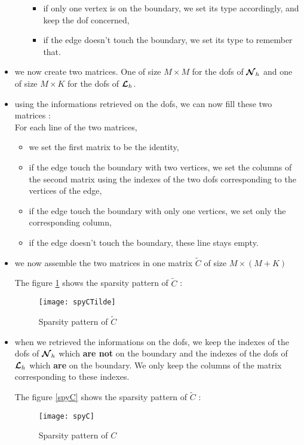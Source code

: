 \begin{itemize}
\begin{itemize}
\begin{itemize}
\item if only one vertex is on the boundary, we set its type accordingly, and
  keep the dof concerned,
\item if the edge doesn't touch the boundary, we set its type to remember that.
\end{itemize}
\end{itemize}
\item we now create two matrices. One of size $M\times M$ for the dofs of ${\bm{\mathcal{N}}}_h$ and one of size $M\times K$ for the dofs of ${\bm{\mathcal{L}}}_h$.

\item using the informations retrieved on the dofs, we can now fill these two
  matrices :\\
For each line of the two matrices,
\begin{itemize}
\item we set the first matrix to be the identity,
\item if the edge touch the boundary with two vertices, we set the columns of
  the second matrix using the indexes of the two dofs corresponding to the
  vertices of the edge,
\item if the edge touch the boundary with only one vertices, we set only the
  corresponding column,
\item if the edge doesn't touch the boundary, these line stays empty. 
\end{itemize}

\item we now assemble the two matrices in one matrix $\tilde{C}$ of size $M\times (M+K)$

The figure \ref{spyCTilde} shows the sparsity pattern of $\tilde{C}$ : 
\begin{figure}[H]
\centering
\texttt{[image: spyCTilde]}
\caption{Sparsity pattern of $\tilde{C}$}
\label{spyCTilde}
\end{figure}
\item when we retrieved the informations on the dofs, we keep the indexes of the dofs of ${\bm{\mathcal{N}}}_h$ which {\bf are not} on the boundary and the indexes of the dofs of ${\bm{\mathcal{L}}}_h$ which {\bf are} on the boundary. We only keep the columns of the matrix corresponding to these indexes.

The figure \ref{spyC} shows the sparsity pattern of $\tilde{C}$ : 
\begin{figure}[H]
\centering
\texttt{[image: spyC]}
\caption{Sparsity pattern of $C$}

\end{figure}
\end{itemize}
